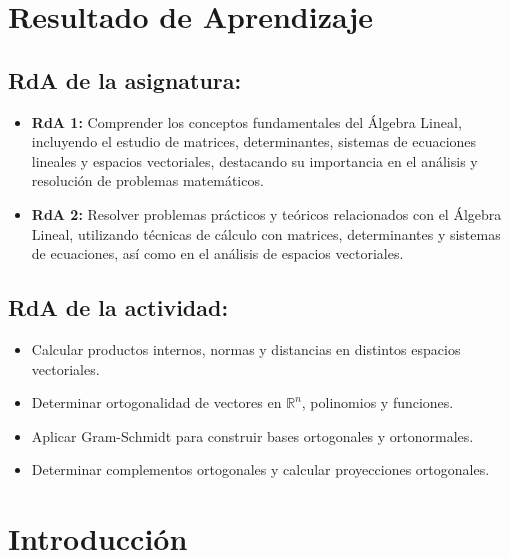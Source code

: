 \documentclass[a4,11pt]{aleph-notas}
\begin{document}
\encabezado 

\section*{Resultado de Aprendizaje}

\subsection*{RdA de la asignatura:}
\begin{itemize}[leftmargin=*]
    \item \textbf{RdA 1:} Comprender los conceptos fundamentales del Álgebra Lineal, incluyendo el estudio de matrices, determinantes, sistemas de ecuaciones lineales y espacios vectoriales, destacando su importancia en el análisis y resolución de problemas matemáticos.
    \item \textbf{RdA 2:} Resolver problemas prácticos y teóricos relacionados con el Álgebra Lineal, utilizando técnicas de cálculo con matrices, determinantes y sistemas de ecuaciones, así como en el análisis de espacios vectoriales.    
\end{itemize}


\subsection*{RdA de la actividad:}
\begin{itemize}[leftmargin=*]
    \item Calcular productos internos, normas y distancias en distintos espacios vectoriales.
    \item Determinar ortogonalidad de vectores en $\mathbb{R}^n$, polinomios y funciones.
    \item Aplicar Gram-Schmidt para construir bases ortogonales y ortonormales.
    \item Determinar complementos ortogonales y calcular proyecciones ortogonales.
\end{itemize}

\section*{Introducción}
\end{document}
